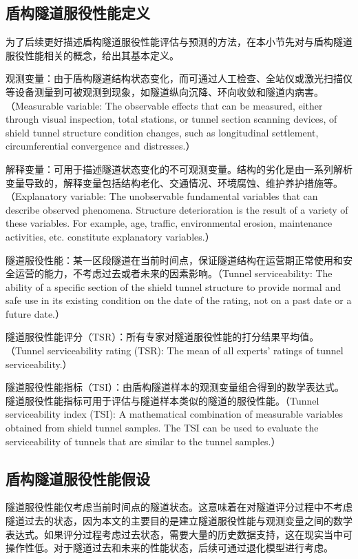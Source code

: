 \subsection{盾构隧道服役性能定义}

为了后续更好描述盾构隧道服役性能评估与预测的方法，在本小节先对与盾构隧道服役性能相关的概念，给出其基本定义。

观测变量：由于盾构隧道结构状态变化，而可通过人工检查、全站仪或激光扫描仪等设备测量到可被观测到现象，如隧道纵向沉降、环向收敛和隧道内病害。（Measurable variable: The observable effects that can be measured, either through visual inspection, total stations, or tunnel section scanning devices, of shield tunnel structure condition changes, such as longitudinal settlement, circumferential convergence and distresses.）

解释变量：可用于描述隧道状态变化的不可观测变量。结构的劣化是由一系列解析变量导致的，解释变量包括结构老化、交通情况、环境腐蚀、维护养护措施等。（Explanatory variable: The unobservable fundamental variables that can describe observed phenomena. Structure deterioration is the result of a variety of these variables. For example, age, traffic, environmental erosion, maintenance activities, etc. constitute explanatory variables.）

隧道服役性能：某一区段隧道在当前时间点，保证隧道结构在运营期正常使用和安全运营的能力，不考虑过去或者未来的因素影响。（Tunnel serviceability: The ability of a speciﬁc section of the shield tunnel structure to provide normal and safe use in its existing condition on the date of the rating, not on a past date or a future date.）

隧道服役性能评分（TSR）：所有专家对隧道服役性能的打分结果平均值。（Tunnel serviceability rating (TSR): The mean of all experts' ratings of tunnel serviceability.）

隧道服役性能指标（TSI）：由盾构隧道样本的观测变量组合得到的数学表达式。隧道服役性能指标可用于评估与隧道样本类似的隧道的服役性能。（Tunnel serviceability index (TSI): A mathematical combination of measurable variables obtained from shield tunnel samples. The TSI can be used to evaluate the serviceability of tunnels that are similar to the tunnel samples.）

\subsection{盾构隧道服役性能假设}

隧道服役性能仅考虑当前时间点的隧道状态。这意味着在对隧道评分过程中不考虑隧道过去的状态，因为本文的主要目的是建立隧道服役性能与观测变量之间的数学表达式。如果评分过程考虑过去状态，需要大量的历史数据支持，这在现实当中可操作性低。对于隧道过去和未来的性能状态，后续可通过退化模型进行考虑。

